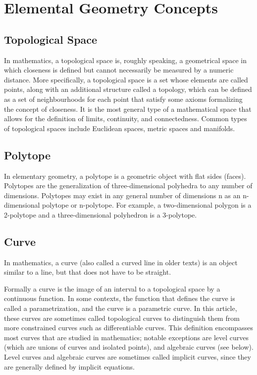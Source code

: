 \appendix

\chapter{Elemental Geometry Concepts}

\section{Topological Space}
In mathematics, a topological space is, roughly speaking, a geometrical space in which closeness is defined but cannot necessarily be measured by a numeric distance. More specifically, a topological space is a set whose elements are called points, along with an additional structure called a topology, which can be defined as a set of neighbourhoods for each point that satisfy some axioms formalizing the concept of closeness. It is the most general type of a mathematical space that allows for the definition of limits, continuity, and connectedness. Common types of topological spaces include Euclidean spaces, metric spaces and manifolds. 

\section{Polytope}
In elementary geometry, a polytope is a geometric object with flat sides (faces). Polytopes are the generalization of three-dimensional polyhedra to any number of dimensions. Polytopes may exist in any general number of dimensions n as an n-dimensional polytope or n-polytope. For example, a two-dimensional polygon is a 2-polytope and a three-dimensional polyhedron is a 3-polytope.

\section{Curve}
In mathematics, a curve (also called a curved line in older texts) is an object similar to a line, but that does not have to be straight.\par
Formally a curve is the image of an interval to a topological space by a continuous function. In some contexts, the function that defines the curve is called a parametrization, and the curve is a parametric curve. In this article, these curves are sometimes called topological curves to distinguish them from more constrained curves such as differentiable curves. This definition encompasses most curves that are studied in mathematics; notable exceptions are level curves (which are unions of curves and isolated points), and algebraic curves (see below). Level curves and algebraic curves are sometimes called implicit curves, since they are generally defined by implicit equations. 

